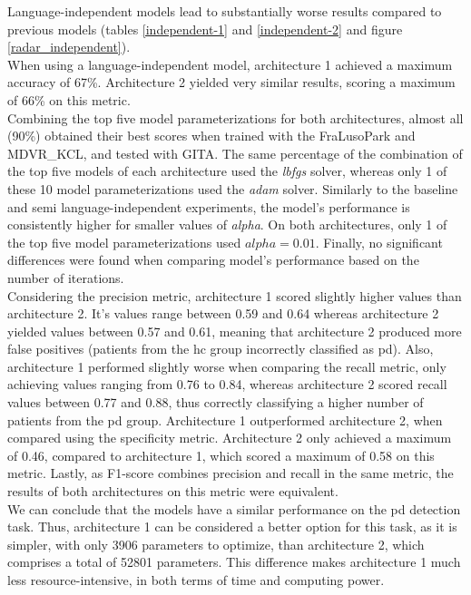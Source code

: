 Language-independent models lead to substantially worse results compared to previous models (tables \ref{independent-1} and \ref{independent-2} and figure \ref{radar_independent}). \\
When using a language-independent model, architecture 1 achieved a maximum accuracy of 67\%. Architecture 2 yielded very similar results, scoring a maximum of 66\% on this metric. \\
Combining the top five model parameterizations for both architectures, almost all (90\%) obtained their best scores when trained with the FraLusoPark and MDVR\_KCL, and tested with GITA. The same percentage of the combination of the top five models of each architecture used the \textit{lbfgs} solver, whereas only 1 of these 10 model parameterizations used the \textit{adam} solver. Similarly to the baseline and semi language-independent experiments, the model's performance is consistently higher for smaller values of \textit{alpha}. On both architectures, only 1 of the top five model parameterizations used $alpha = 0.01$. Finally, no significant differences were found when comparing model's performance based on the number of iterations. \\
Considering the precision metric, architecture 1 scored slightly higher values than architecture 2. It's values range between 0.59 and 0.64 whereas architecture 2 yielded values between 0.57 and 0.61, meaning that architecture 2 produced more false positives (patients from the \gls{hc} group incorrectly classified as \gls{pd}). Also, architecture 1 performed slightly worse when comparing the recall metric, only achieving values ranging from 0.76 to 0.84, whereas architecture 2 scored recall values between 0.77 and 0.88, thus correctly classifying a higher number of patients from the \gls{pd} group. Architecture 1 outperformed architecture 2, when compared using the specificity metric. Architecture 2 only achieved a maximum of 0.46, compared to architecture 1, which scored a maximum of 0.58 on this metric. Lastly, as F1-score combines precision and recall in the same metric, the results of both architectures on this metric were equivalent. \\
We can conclude that the models have a similar performance on the \gls{pd} detection task. Thus, architecture 1 can be considered a better option for this task, as it is simpler, with only 3906 parameters to optimize, than architecture 2, which comprises a total of 52801 parameters. This difference makes architecture 1 much less resource-intensive, in both terms of time and computing power.

